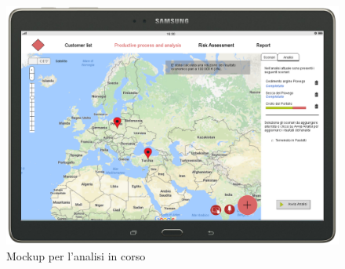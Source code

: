 \begin{figure}[H]
	\centering
	\includegraphics[scale=0.29]{img/MockUp/m3.png}
	\caption{Mockup per l'analisi in corso}
\end{figure}


\newpage
